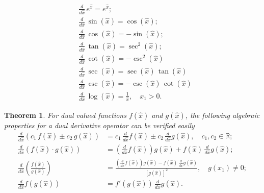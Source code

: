 \documentclass[11pt,a4paper,fleqn]{article}
\newtheorem{theorem}{Theorem}
\numberwithin{equation}{section}
\numberwithin{lemma}{section}
\numberwithin{theorem}{section}
\numberwithin{corollary}{section}
\begin{document}
\begin{align*}
	& \frac{d}{d \widehat{x}} \, e^{\widehat{x}} = e^{\widehat{x}}; \\
	&  \frac{d}{d \widehat{x}} \,  \sin (\widehat{x}) = \cos (\widehat{x});\\
	 & \frac{d}{d \widehat{x}} \,  \cos (\widehat{x}) = - \sin (\widehat{x}); \\
	 &  \frac{d}{d \widehat{x}} \,  \tan (\widehat{x}) = \sec^2 (\widehat{x});\\
	 & \frac{d}{d \widehat{x}} \,  \cot (\widehat{x}) = - \csc^2 (\widehat{x})\\
	 & \frac{d}{d \widehat{x}} \,  \sec (\widehat{x}) = \sec (\widehat{x}) \, \tan (\widehat{x})\\
	 & \frac{d}{d \widehat{x}} \,  \csc (\widehat{x}) = - \csc (\widehat{x}) \, \cot (\widehat{x})\\
	 & \frac{d}{d \widehat{x}} \,  \log (\widehat{x}) = \frac{1}{\widehat{x}}, \quad x_1 > 0.
\end{align*}
\begin{theorem}
For dual valued functions $f(\widehat{x})$ and $g(\widehat{x})$, the following algebraic properties for a dual derivative operator can be verified easily
\begin{align}
 \frac{d}{d \widehat{x}} (c_1 \, f(\widehat{x}) \pm c_2 \, g(\widehat{x})) & = c_1 \, \frac{d}{d \widehat{x}} f(\widehat{x}) \pm c_2 \, \frac{d}{d \widehat{x}} g(\widehat{x}), \quad c_1, c_2 \in \mathbb{R};\label{3.3}
 \\[5pt]
 \frac{d}{d \widehat{x}} ( f(\widehat{x}) \cdot  g(\widehat{x})) & =  \left(\frac{d}{d \widehat{x}} f(\widehat{x})\right) g(\widehat{x}) + f(\widehat{x}) \,  \frac{d}{d \widehat{x}} g(\widehat{x});
 \\[5pt]
 \frac{d}{d \widehat{x}} \left(\frac{f(\widehat{x})} {g(\widehat{x})}\right) & =  \frac{\left(\frac{d}{d \widehat{x}} f(\widehat{x})\right) g(\widehat{x}) - f(\widehat{x}) \,  \frac{d}{d \widehat{x}} g(\widehat{x})}{[g(\widehat{x})]^2}, \quad g(x_1) \ne 0;
 \\[5pt]
 \frac{d}{d \widehat{x}}  f(g(\widehat{x})) & =    f'(g(\widehat{x})) \,  \frac{d}{d \widehat{x}} g(\widehat{x}). 
\end{align}
\end{theorem}
\end{document}
